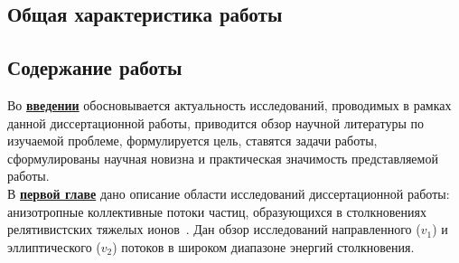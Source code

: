 ﻿\subsection*{Общая характеристика работы}

\newcommand{\actuality}{\underline{\textbf{Актуальность темы.}}}
\newcommand{\aim}{\underline{\textbf{Целью}}}
\newcommand{\tasks}{\underline{\textbf{задачи}}}
\newcommand{\defpositions}{\underline{\textbf{Основные положения, выносимые на~защиту:}}}
\newcommand{\novelty}{\underline{\textbf{Научная новизна:}}}
\newcommand{\influence}{\underline{\textbf{Практическая значимость}}}
\newcommand{\reliability}{\underline{\textbf{Достоверность}}}
\newcommand{\probation}{\underline{\textbf{Апробация работы.}}}
\newcommand{\contribution}{\underline{\textbf{Личный вклад.}}}
\newcommand{\publications}{\underline{\textbf{Публикации.}}}




\subsection*{Содержание работы}
Во \underline{\textbf{введении}} обосновывается актуальность исследований, проводимых в рамках данной диссертационной работы, приводится обзор научной литературы по изучаемой проблеме, формулируется цель, ставятся задачи работы, сформулированы научная новизна и практическая значимость представляемой работы.\\
В \underline{\textbf{  первой главе}} дано описание области исследований диссертационной работы: анизотропные коллективные потоки частиц, образующихся в столкновениях релятивистских
тяжелых ионов~\cite{Voloshin:2008dg}. Дан обзор исследований  направленного ($v_1$) и эллиптического ($v_2$) потоков в широком диапазоне энергий столкновения.

